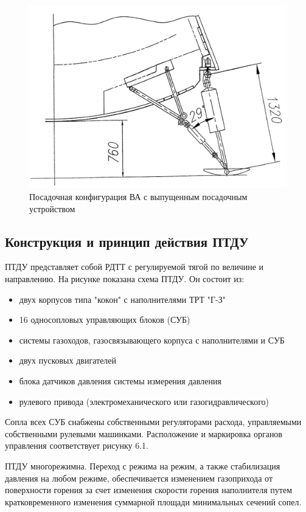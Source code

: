 \begin{figure}[h]
	\centering
	\includegraphics[scale=0.9]{images/posad_config.jpg}
	\caption{Посадочная конфигурация ВА с выпущенным посадочным устройством}
	\label{fig:posad_config}
\end{figure}
\clearpage

\subsection{Конструкция и принцип действия ПТДУ}
ПТДУ представляет собой РДТТ с регулируемой тягой по величине и направлению. На рисунке показана схема ПТДУ. Он состоит из:\\\begin{itemize}
	\item двух корпусов типа "кокон"  с наполнителями ТРТ "Г-З"
	\item 16 односопловых управляющих блоков (СУБ)
	\item системы газоходов, газосвязывающего корпуса с наполнителями и СУБ
	\item двух пусковых двигателей 
	\item блока датчиков давления системы измерения давления
	\item рулевого привода (электромеханического или газогидравлического) 
\end{itemize}

Сопла всех СУБ снабжены собственными регуляторами расхода, управляемыми собственными рулевыми машинками. Расположение и маркировка органов управления соответствует рисунку 6.1.

ПТДУ многорежимна. Переход с режима на режим, а также стабилизация давления на любом режиме, обеспечивается изменением газоприхода от поверхности горения за счет изменения скорости горения наполнителя путем кратковременного изменения суммарной площади минимальных сечений сопел.

